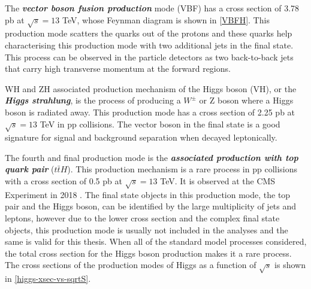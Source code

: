 The \textbf{\emph{vector boson fusion production}} mode (VBF) has a cross section of 3.78 pb at $\sqrt{s}=13$ TeV, whose Feynman diagram is shown in \autoref{VBFH}. This production mode scatters the quarks out of the protons and these quarks help characterising this production mode with two additional jets in the final state. This process can be observed in the particle detectors as two back-to-back jets that carry high transverse momentum at the forward regions.

WH and ZH associated production mechanism of the Higgs boson (VH), or the \textbf{\emph{Higgs strahlung}}, is the process of producing a $W^\pm$ or Z boson where a Higgs boson is radiated away. This production mode has a cross section of 2.25 pb at $\sqrt{s}=13$ TeV in pp collisions. The vector boson in the final state is a good signature for signal and background separation when decayed leptonically.

The fourth and final production mode is the \textbf{\emph{associated production with top quark pair}} ($t\bar tH$). This production mechanism is a rare process in pp collisions with a cross section of 0.5 pb at $\sqrt{s} = 13$ TeV. It is observed at the CMS Experiment in 2018 \cite{ttH-higgs}. The final state objects in this production mode, the top pair and the Higgs boson, can be identified by the large multiplicity of jets and leptons, however due to the lower cross section and the complex final state objects, this production mode is usually not included in the analyses and the same is valid for this thesis. When all of the standard model processes considered, the total cross section for the Higgs boson production makes it a rare process. The cross sections of the production modes of Higgs as a function of $\sqrt{s}$ is shown in \autoref{higgs-xsec-vs-sqrtS}.

